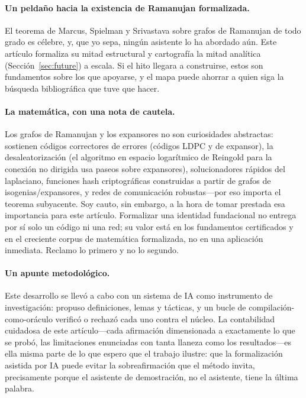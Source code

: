 \documentclass[11pt]{article}
\begin{document}
\paragraph{Un peldaño hacia la existencia de Ramanujan formalizada.}
El teorema de Marcus, Spielman y Srivastava sobre grafos de Ramanujan de todo
grado es célebre, y, que yo sepa, ningún asistente lo ha abordado aún. Este artículo
formaliza su mitad estructural y cartografía la mitad analítica
(Sección~\ref{sec:future}) a escala. Si el hito llegara a construirse, estos son
fundamentos sobre los que apoyarse, y el mapa puede ahorrar a quien siga la
búsqueda bibliográfica que tuve que hacer.

\paragraph{La matemática, con una nota de cautela.}
Los grafos de Ramanujan y los expansores no son curiosidades abstractas: sostienen
códigos correctores de errores (códigos LDPC y de expansor), la desaleatorización
(el algoritmo en espacio logarítmico de Reingold para la conexión no dirigida usa
paseos sobre expansores), solucionadores rápidos del laplaciano, funciones hash
criptográficas construidas a partir de grafos de isogenias/expansores, y redes de
comunicación robustas---por eso importa el teorema subyacente. Soy cauto, sin
embargo, a la hora de tomar prestada esa importancia para este artículo.
Formalizar una identidad fundacional no entrega por sí solo un código ni una red;
su valor está en los fundamentos certificados y en el creciente corpus de
matemática formalizada, no en una aplicación inmediata. Reclamo lo primero y no lo
segundo.

\paragraph{Un apunte metodológico.}
Este desarrollo se llevó a cabo con un sistema de IA como instrumento de
investigación: propuso definiciones, lemas y tácticas, y un bucle de
compilación-como-oráculo verificó o rechazó cada uno contra el núcleo. La
contabilidad cuidadosa de este artículo---cada afirmación dimensionada a
exactamente lo que se probó, las limitaciones enunciadas con tanta llaneza como
los resultados---es ella misma parte de lo que espero que el trabajo ilustre: que
la formalización asistida por IA puede evitar la sobreafirmación que el método
invita, precisamente porque el asistente de demostración, no el asistente, tiene
la última palabra.
\end{document}
